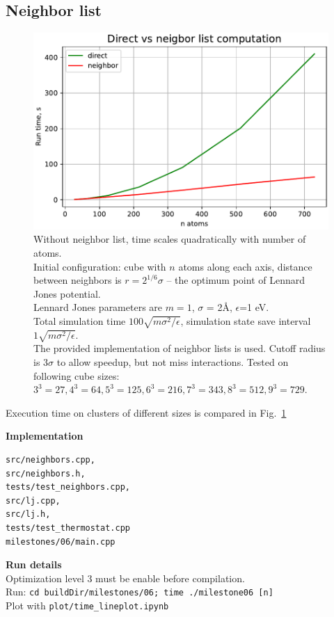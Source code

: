 \documentclass[12pt,a4paper]{article}
\begin{document}
\clearpage

\subsection*{Neighbor list}

\begin{figure}[htb]
	\centering
	\includegraphics[width=.8\linewidth]{img/milestone06-time.pdf}
	\caption{Without neighbor list, time scales quadratically with number of atoms.\\
	Initial configuration: cube with $n$ atoms along each axis, distance between neighbors is $r=2^{1/6}\sigma$ -- the optimum point of Lennard Jones potential.\\	
	Lennard Jones parameters are $m=1$, $\sigma$ = 2Å, $\epsilon$=1 eV.\\
	Total simulation time \( 100 \sqrt{m\sigma^2 / \epsilon} \), simulation state save interval \( 1 \sqrt{m\sigma^2 / \epsilon} \).\\
	The provided implementation of neighbor lists is used. Cutoff radius is \( 3 \sigma \) to allow speedup, but not miss interactions. Tested on following cube sizes: $3^3=27, 4^3=64, 5^3=125, 6^3=216, 7^3=343, 8^3=512, 9^3=729$.
	}
	\label{fig:neighbor}
\end{figure}

Execution time on clusters of different sizes is compared in Fig.~\ref{fig:neighbor}

{\bf Implementation}
\begin{lstlisting}[breaklines]
src/neighbors.cpp,
src/neighbors.h,
tests/test_neighbors.cpp,
src/lj.cpp,
src/lj.h,
tests/test_thermostat.cpp
milestones/06/main.cpp
\end{lstlisting}

{\bf Run details}\\
Optimization level 3 must be enable before compilation.\\
Run: \verb|cd buildDir/milestones/06; time ./milestone06 [n]|\\
Plot with \verb|plot/time_lineplot.ipynb|
\end{document}
